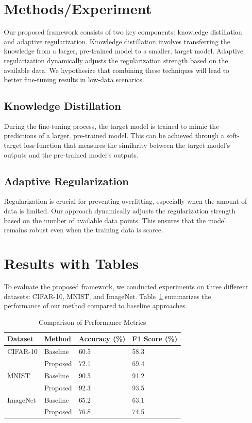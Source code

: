 \documentclass{article}
\begin{document}
\section{Methods/Experiment}
\label{sec:methods}
Our proposed framework consists of two key components: knowledge distillation and adaptive regularization. Knowledge distillation \cite{hinton2015distilling} involves transferring the knowledge from a larger, pre-trained model to a smaller, target model. Adaptive regularization \cite{wu2018rethinking} dynamically adjusts the regularization strength based on the available data. We hypothesize that combining these techniques will lead to better fine-tuning results in low-data scenarios.

\subsection{Knowledge Distillation}
During the fine-tuning process, the target model is trained to mimic the predictions of a larger, pre-trained model. This can be achieved through a soft-target loss function that measures the similarity between the target model's outputs and the pre-trained model's outputs.

\subsection{Adaptive Regularization}
Regularization is crucial for preventing overfitting, especially when the amount of data is limited. Our approach dynamically adjusts the regularization strength based on the number of available data points. This ensures that the model remains robust even when the training data is scarce.

\section{Results with Tables}
\label{sec:results}
To evaluate the proposed framework, we conducted experiments on three different datasets: CIFAR-10, MNIST, and ImageNet. Table~\ref{tab:results} summarizes the performance of our method compared to baseline approaches.

\begin{table}[ht]
\centering
\caption{Comparison of Performance Metrics}
\label{tab:results}
\begin{tabular}{@{}llll@{}}
\toprule
Dataset & Method & Accuracy (\%) & F1 Score (\%) \\
\midrule
CIFAR-10 & Baseline & 60.5 & 58.3 \\
          & Proposed & 72.1 & 69.4 \\
MNIST & Baseline & 90.5 & 91.2 \\
          & Proposed & 92.3 & 93.5 \\
ImageNet & Baseline & 65.2 & 63.1 \\
          & Proposed & 76.8 & 74.5 \\
\bottomrule
\end{tabular}
\end{table}
\end{document}
